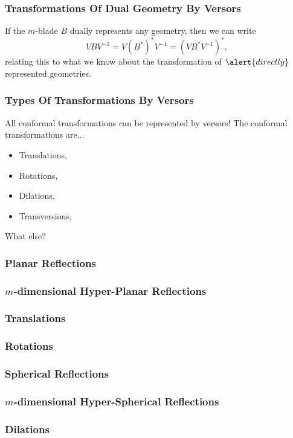 \documentclass{beamer}
\begin{document}
\begin{frame}
\frametitle{Transformations Of \alert{Dual} Geometry By Versors}
If the $m$-blade $B$ \alert{dually} represents any geometry, then we can write
\begin{equation*}
VBV^{-1} = V(B^*)^*V^{-1} = (VB^*V^{-1})^*,
\end{equation*}
relating this to what we know about the transformation of $\alert{directly}$ represented geometries.
\end{frame}

\begin{frame}
\frametitle{Types Of Transformations By Versors}
All conformal transformations can be represented by versors!
The conformal transformations are...
\begin{itemize}
\item Translations,
\item Rotations,
\item Dilations,
\item Transversions,
\end{itemize}
What else?
\end{frame}

\begin{frame}
\frametitle{Planar Reflections}
\end{frame}

\begin{frame}
\frametitle{$m$-dimensional Hyper-Planar Reflections}
\end{frame}

\begin{frame}
\frametitle{Translations}
\end{frame}

\begin{frame}
\frametitle{Rotations}
\end{frame}

\begin{frame}
\frametitle{Spherical Reflections}
\end{frame}

\begin{frame}
\frametitle{$m$-dimensional Hyper-Spherical Reflections}
\end{frame}

\begin{frame}
\frametitle{Dilations}
\end{frame}
\end{document}
